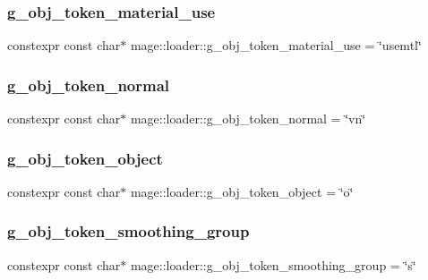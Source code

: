 \subsubsection{\texorpdfstring{g\+\_\+obj\+\_\+token\+\_\+material\+\_\+use}{g\_obj\_token\_material\_use}}
{\footnotesize\ttfamily constexpr const char$\ast$ mage\+::loader\+::g\+\_\+obj\+\_\+token\+\_\+material\+\_\+use = \char`\"{}usemtl\char`\"{}}

\hypertarget{namespacemage_1_1loader_a3456adab4f4e3c25801d3aff36396d7e}{}\label{namespacemage_1_1loader_a3456adab4f4e3c25801d3aff36396d7e} 
\subsubsection{\texorpdfstring{g\+\_\+obj\+\_\+token\+\_\+normal}{g\_obj\_token\_normal}}
{\footnotesize\ttfamily constexpr const char$\ast$ mage\+::loader\+::g\+\_\+obj\+\_\+token\+\_\+normal = \char`\"{}vn\char`\"{}}

\hypertarget{namespacemage_1_1loader_a7a117ec0fa7a3509a663afe6ac561b22}{}\label{namespacemage_1_1loader_a7a117ec0fa7a3509a663afe6ac561b22} 
\subsubsection{\texorpdfstring{g\+\_\+obj\+\_\+token\+\_\+object}{g\_obj\_token\_object}}
{\footnotesize\ttfamily constexpr const char$\ast$ mage\+::loader\+::g\+\_\+obj\+\_\+token\+\_\+object = \char`\"{}o\char`\"{}}

\hypertarget{namespacemage_1_1loader_a43d977a9091ce35265a1b63a64421977}{}\label{namespacemage_1_1loader_a43d977a9091ce35265a1b63a64421977} 
\subsubsection{\texorpdfstring{g\+\_\+obj\+\_\+token\+\_\+smoothing\+\_\+group}{g\_obj\_token\_smoothing\_group}}
{\footnotesize\ttfamily constexpr const char$\ast$ mage\+::loader\+::g\+\_\+obj\+\_\+token\+\_\+smoothing\+\_\+group = \char`\"{}s\char`\"{}}

